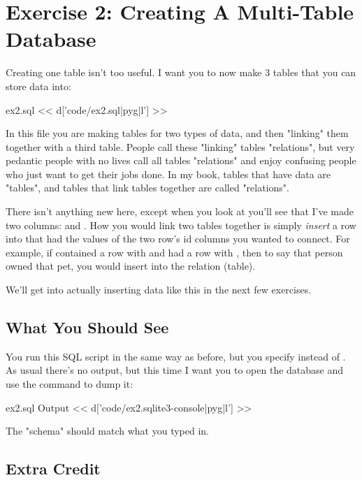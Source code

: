 \chapter{Exercise 2: Creating A Multi-Table Database}

Creating one table isn't too useful.  I want you to now make 3 tables that 
you can store data into:

\begin{code}{ex2.sql}
<< d['code/ex2.sql|pyg|l'] >>
\end{code}

In this file you are making tables for two types of data, and then
"linking" them together with a third table.  People call these 
"linking" tables "relations", but very pedantic people with no
lives call all tables "relations" and enjoy confusing people who
just want to get their jobs done.  In my book, tables that have data
are "tables", and tables that link tables together are called "relations".

There isn't anything new here, except when you look at 
you'll see that I've made two columns:  and .
How you would link two tables together is simply \emph{insert} a row
into  that had the values of the two row's id columns
you wanted to connect.  For example, if  contained a row with
 and  had a row with , then to say
that person owned that pet, you would insert 
into the  relation (table).

We'll get into actually inserting data like this in the next few exercises.

\section{What You Should See}

You run this SQL script in the same way as before, but you specify
 instead of .  As usual there's no output,
but this time I want you to open the database and use the 
 command to dump it:

\begin{code}{ex2.sql Output}
<< d['code/ex2.sqlite3-console|pyg|l'] >>
\end{code}

The "schema" should match what you typed in.

\section{Extra Credit}

